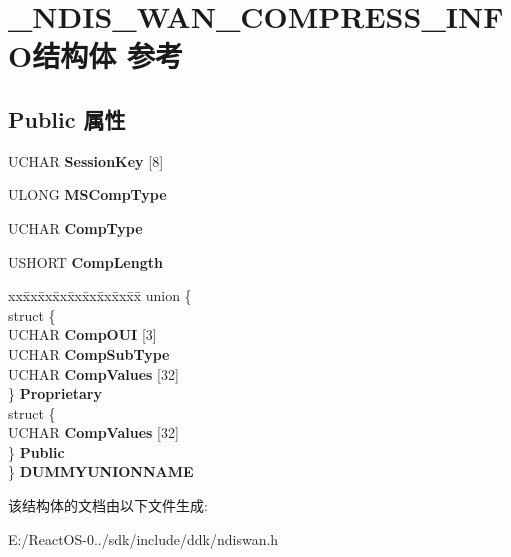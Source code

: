 \hypertarget{struct___n_d_i_s___w_a_n___c_o_m_p_r_e_s_s___i_n_f_o}{}\section{\+\_\+\+N\+D\+I\+S\+\_\+\+W\+A\+N\+\_\+\+C\+O\+M\+P\+R\+E\+S\+S\+\_\+\+I\+N\+F\+O结构体 参考}
\label{struct___n_d_i_s___w_a_n___c_o_m_p_r_e_s_s___i_n_f_o}
\subsection*{Public 属性}
\begin{DoxyCompactItemize}
\item 
\mbox{\label{struct___n_d_i_s___w_a_n___c_o_m_p_r_e_s_s___i_n_f_o_ad2401766eabe090f8bfa7f47459bc117}} 
U\+C\+H\+AR {\bfseries Session\+Key} \mbox{[}8\mbox{]}
\item 
\mbox{\label{struct___n_d_i_s___w_a_n___c_o_m_p_r_e_s_s___i_n_f_o_ac79aa0ee6a14c16af7aa2e9e2c979691}} 
U\+L\+O\+NG {\bfseries M\+S\+Comp\+Type}
\item 
\mbox{\label{struct___n_d_i_s___w_a_n___c_o_m_p_r_e_s_s___i_n_f_o_a665f52cffd1cbcb6f448b1165d98064d}} 
U\+C\+H\+AR {\bfseries Comp\+Type}
\item 
\mbox{\label{struct___n_d_i_s___w_a_n___c_o_m_p_r_e_s_s___i_n_f_o_acab4a9111746c55578b8696ea271af62}} 
U\+S\+H\+O\+RT {\bfseries Comp\+Length}
\item 
\mbox{\label{struct___n_d_i_s___w_a_n___c_o_m_p_r_e_s_s___i_n_f_o_a449b5ac6b8f80ef0397238e31a3e6bf9}} 
\begin{tabbing}
xx\=xx\=xx\=xx\=xx\=xx\=xx\=xx\=xx\=\kill
union \{\\
\>struct \{\\
\>\>UCHAR {\bfseries CompOUI} \mbox{[}3\mbox{]}\\
\>\>UCHAR {\bfseries CompSubType}\\
\>\>UCHAR {\bfseries CompValues} \mbox{[}32\mbox{]}\\
\>\} {\bfseries Proprietary}\\
\>struct \{\\
\>\>UCHAR {\bfseries CompValues} \mbox{[}32\mbox{]}\\
\>\} {\bfseries Public}\\
\} {\bfseries DUMMYUNIONNAME}\\

\end{tabbing}\end{DoxyCompactItemize}


该结构体的文档由以下文件生成\+:\begin{DoxyCompactItemize}
\item 
E\+:/\+React\+O\+S-\/0../sdk/include/ddk/ndiswan.\+h\end{DoxyCompactItemize}
